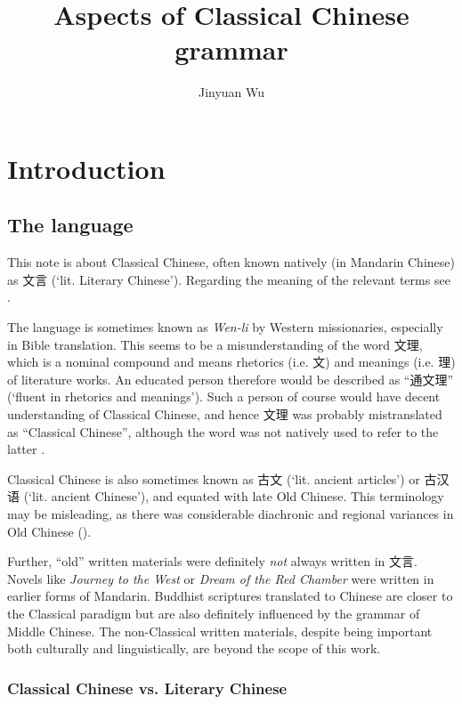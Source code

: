 \documentclass[UTF8, a4paper, oneside, scheme=plain, 12pt]{ctexrep}
\title{Aspects of Classical Chinese grammar}
\author{Jinyuan Wu}
\newcommand*{\citepage}[1]{p.~{#1}}
\newcommand{\form}[1]{\emph{#1}}
\newcommand{\work}[1]{\textit{#1}}
\newcommand{\translate}[1]{`#1'}
\begin{document}
\automath

\maketitle

\chapter{Introduction}

\section{The language}

This note is about Classical Chinese,
often known natively (in Mandarin Chinese) as 文言 (\translate{lit. Literary Chinese}).
Regarding the meaning of the relevant terms see .

The language is sometimes known as \form{Wen-li} by Western missionaries,
especially in Bible translation.
This seems to be a misunderstanding of the word 文理,
which is a nominal compound and means rhetorics (i.e. 文) and meanings (i.e. 理) of literature works.
An educated person therefore would be described as ``通文理'' (\translate{fluent in rhetorics and meanings}).
Such a person of course would have decent understanding of Classical Chinese,
and hence 文理 was probably mistranslated as ``Classical Chinese'',
although the word was not natively used to refer to the latter \citep[\citepage{161}]{zetzsche2017bible}.

Classical Chinese is also sometimes known as 古文 (\translate{lit. ancient articles})
or 古汉语 (\translate{lit. ancient Chinese}),
and equated with late Old Chinese.
This terminology may be misleading, 
as there was considerable diachronic and regional variances in Old Chinese ().

Further, ``old'' written materials were definitely \emph{not} always written in 文言. 
Novels like \work{Journey to the West} or \work{Dream of the Red Chamber} were written in earlier forms of Mandarin.
Buddhist scriptures translated to Chinese are closer to the Classical paradigm
but are also definitely influenced by the grammar of Middle Chinese.
The non-Classical written materials, despite being important both culturally and linguistically,
are beyond the scope of this work.

\subsection{Classical Chinese vs. Literary Chinese}\label{sec:introduction.golden-bronze}
\end{document}
